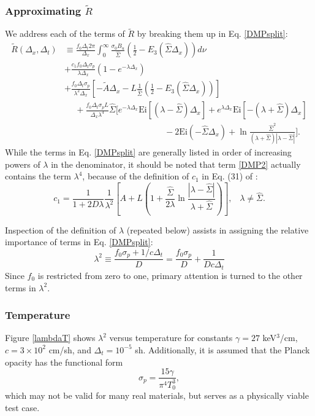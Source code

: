 \subsubsection{Approximating $\tilde R$}
We address each of the terms of $\tilde R$ by breaking them up in Eq.
\eqref{DMPsplit}:
\begin{subequations}\label{DMPsplit}
\begin{align}
\tilde R(\Delta_x,\Delta_t)&\equiv\frac{f_0\Delta_t2\pi}{\Delta_x}
  \int_0^\infty\frac{\sigma_0B_u}{\hat\Sigma}\left(\frac{1}{2}-
    E_3(\hat\Sigma\Delta_x)\right)d\nu \label{DMP1}\\
  &+\frac{c_1f_0\Delta_t\sigma_p}{\lambda\Delta_x}(1-e^{-\lambda\Delta_x})
    \label{DMP2}\\
  &+\frac{f_0\Delta_t\sigma_p}{\lambda^2\Delta_x}\left[-\tilde A\Delta_x
    -L\frac{1}{\hat\Sigma}\left(\frac{1}{2}
    -E_3(\hat\Sigma\Delta_x)\right)\right] \label{DMP3}\\
  &\hspace{15pt}+\frac{f_0\Delta_t\sigma_pL}{\Delta_x\lambda^4}\hat\Sigma
    \bigg[e^{-\lambda\Delta_x}\mbox{Ei}[(\lambda-\hat\Sigma)\Delta_x] +
    e^{\lambda\Delta_x}\mbox{Ei}[-(\lambda+\hat\Sigma)\Delta_x] \label{DMP4} \\
  &\hspace{140pt} -2\mbox{Ei}(-\hat\Sigma\Delta_x)+ \nonumber
    \ln\frac{\hat\Sigma^2}{(\lambda+\hat\Sigma)|\lambda-\hat\Sigma|} \bigg].
\end{align}
\end{subequations}
While the terms in Eq. \eqref{DMPsplit} are generally listed in order of
increasing powers of $\lambda$ in the denominator, it should be noted that term
\eqref{DMP2} actually contains the term $\lambda^4$, because of the definition
of $c_1$ in Eq. (31) of \cite{WolLarDen}:
\[c_1=\frac{1}{1+2D\lambda}\frac{1}{\lambda^2}\left[A + 
  L\left(1+\frac{\hat\Sigma}{2\lambda}\ln\frac{|\lambda-\hat\Sigma|}{\lambda +
  \hat\Sigma} \right) \right],\hspace{10pt}\lambda\neq\hat\Sigma. \]

Inspection of the definition of $\lambda$ (repeated below) assists in assigning
the relative importance of terms in Eq. \eqref{DMPsplit}:
\[\lambda^2\equiv\frac{f_0\sigma_p + 1/c\Delta_t}{D}
  = \frac{f_0\sigma_p}{D} + \frac{1}{Dc\Delta_t} \]
  Since $f_0$ is restricted from zero to one, primary attention is turned to the
other terms in $\lambda^2$.


\subsubsection{Temperature}
Figure \ref{lambdaT} shows
$\lambda^2$ versus temperature for constants $\gamma=27$ keV$^3$/cm,
$c=3\times10^2$
cm/sh, and $\Delta_t=10^{-5}$ sh.  Additionally, it is assumed that the Planck
opacity
has the functional form
\begin{equation}
\sigma_p=\frac{15\gamma}{\pi^4T_0^3}\label{sigp assum},
\end{equation}
which may not be valid for many real materials, but serves as a
physically viable test case.

